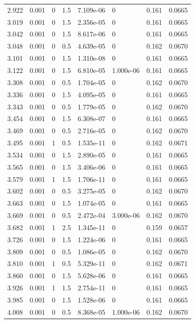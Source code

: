 \documentclass[preview]{standalone}
\begin{document}
{{{\begin{tabular}{L{1.2cm}C{1.2cm} C{0.3cm}C{0.5cm} C{1.4cm}C{1.4cm} C{1.4cm}C{1.4cm}}
  2.922  &  0.001  & 0     & 1.5 &  7.109e-06  & 0  & 0.161 &  0.0665   \\ 
  3.019  &  0.001  & 0     & 1.5 &  2.356e-05  & 0  & 0.161 &  0.0665   \\ 
  3.042  &  0.001  & 0     & 1.5 &  8.617e-06  & 0  & 0.161 &  0.0665   \\ 
  3.048  &  0.001  & 0     & 0.5 &  4.639e-05  & 0  & 0.162 &  0.0670   \\ 
  3.101  &  0.001  & 0     & 1.5 &  1.310e-08  & 0  & 0.161 &  0.0665   \\ 
  3.122  &  0.001  & 0     & 1.5 &  6.810e-05  & 1.000e-06  & 0.161 &  0.0665   \\ 
  3.308  &  0.001  & 0     & 0.5 &  1.704e-05  & 0  & 0.162 &  0.0670   \\ 
  3.336  &  0.001  & 0     & 1.5 &  4.095e-05  & 0  & 0.161 &  0.0665   \\ 
  3.343  &  0.001  & 0     & 0.5 &  1.779e-05  & 0  & 0.162 &  0.0670   \\ 
  3.454  &  0.001  & 0     & 1.5 &  6.308e-07  & 0  & 0.161 &  0.0665   \\ 
  3.469  &  0.001  & 0     & 0.5 &  2.716e-05  & 0  & 0.162 &  0.0670   \\ 
  3.495  &  0.001  & 1     & 0.5 &  1.535e-11  & 0  & 0.162 &  0.0671   \\ 
  3.534  &  0.001  & 0     & 1.5 &  2.890e-05  & 0  & 0.161 &  0.0665   \\ 
  3.565  &  0.001  & 0     & 1.5 &  3.406e-06  & 0  & 0.161 &  0.0665   \\ 
  3.579  &  0.001  & 1     & 1.5 &  1.706e-11  & 0  & 0.161 &  0.0665   \\ 
  3.602  &  0.001  & 0     & 0.5 &  3.275e-05  & 0  & 0.162 &  0.0670   \\ 
  3.663  &  0.001  & 0     & 1.5 &  1.074e-05  & 0  & 0.161 &  0.0665   \\ 
  3.669  &  0.001  & 0     & 0.5 &  2.472e-04  & 3.000e-06  & 0.162 &  0.0670   \\ 
  3.682  &  0.001  & 1     & 2.5 &  1.345e-11  & 0  & 0.159 &  0.0657   \\ 
  3.726  &  0.001  & 0     & 1.5 &  1.224e-06  & 0  & 0.161 &  0.0665   \\ 
  3.809  &  0.001  & 0     & 0.5 &  1.086e-05  & 0  & 0.162 &  0.0670   \\ 
  3.810  &  0.001  & 1     & 0.5 &  5.329e-11  & 0  & 0.162 &  0.0671   \\ 
  3.860  &  0.001  & 0     & 1.5 &  5.628e-06  & 0  & 0.161 &  0.0665   \\ 
  3.926  &  0.001  & 1     & 1.5 &  2.754e-11  & 0  & 0.161 &  0.0665   \\ 
  3.985  &  0.001  & 0     & 1.5 &  1.528e-06  & 0  & 0.161 &  0.0665   \\ 
  4.008  &  0.001  & 0     & 0.5 &  8.368e-05  & 1.000e-06  & 0.162 &  0.0670   \\ 
\hline 
\end{tabular} 

}}}
\end{document}
